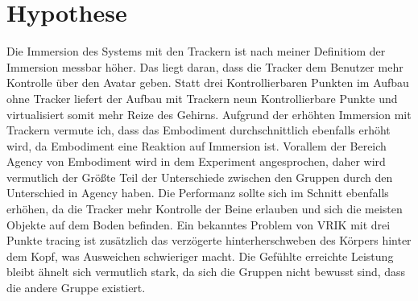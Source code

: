 \section{Hypothese}
Die Immersion des Systems mit den Trackern ist nach meiner Definitiom der Immersion messbar höher. Das liegt daran, dass die Tracker dem Benutzer mehr Kontrolle über den Avatar geben. Statt drei Kontrollierbaren Punkten im Aufbau ohne Tracker liefert der Aufbau mit Trackern neun Kontrollierbare Punkte und virtualisiert somit mehr Reize des Gehirns.
Aufgrund der erhöhten Immersion mit Trackern vermute ich, dass das Embodiment durchschnittlich ebenfalls erhöht wird, da Embodiment eine Reaktion auf Immersion ist. Vorallem der Bereich Agency von Embodiment wird in dem Experiment angesprochen, daher wird vermutlich der Größte Teil der Unterschiede zwischen den Gruppen durch den Unterschied in Agency haben.
Die Performanz sollte sich im Schnitt ebenfalls erhöhen, da die Tracker mehr Kontrolle der Beine erlauben und sich die meisten Objekte auf dem Boden befinden. Ein bekanntes Problem von VRIK mit drei Punkte tracing ist zusätzlich das verzögerte hinterherschweben des Körpers hinter dem Kopf, was Ausweichen schwieriger macht. Die Gefühlte erreichte Leistung bleibt ähnelt sich vermutlich stark, da sich die Gruppen nicht bewusst sind, dass die andere Gruppe existiert.


